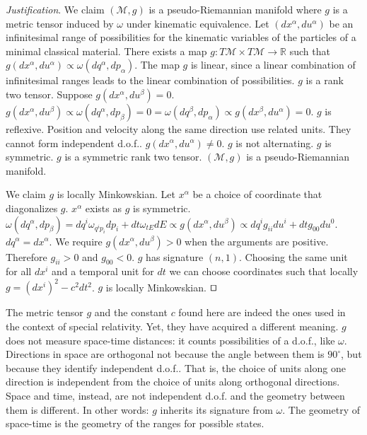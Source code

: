 \documentclass[smallextended]{svjour3}
\numberwithin{equation}{section}
\newenvironment{justification}{\emph{Justification}.}{\hfill\(\qed\)}
\theoremstyle{definition}
\newenvironment{justification}{\emph{Justification}.}{\qed}
\begin{document}
\begin{justification}
	We claim $(\mathcal{M}, g)$ is a pseudo-Riemannian manifold where $g$ is a metric tensor induced by $\omega$ under kinematic equivalence. Let $(dx^\alpha, du^\alpha)$ be an infinitesimal range of possibilities for the kinematic variables of the particles of a minimal classical material. There exists a map $g : T\mathcal{M} \times T\mathcal{M} \rightarrow \mathbb{R}$ such that $g(dx^\alpha, du^\alpha) \propto \omega(dq^\alpha, dp_\alpha)$. The map $g$ is linear, since a linear combination of infinitesimal ranges leads to the linear combination of possibilities. $g$ is a rank two tensor. Suppose $g(dx^\alpha, du^\beta) = 0$. $g(dx^\alpha, du^\beta) \propto \omega(dq^\alpha, dp_\beta) = 0 = \omega(dq^\beta, dp_\alpha) \propto g(dx^\beta, du^\alpha) = 0$. $g$ is reflexive. Position and velocity along the same direction use related units. They cannot form independent d.o.f.. $g(dx^\alpha, du^\alpha) \neq 0$. $g$ is not alternating. $g$ is symmetric. $g$ is a symmetric rank two tensor. $(\mathcal{M}, g)$ is a pseudo-Riemannian manifold.
	
	We claim $g$ is locally Minkowskian. Let $x^\alpha$ be a choice of coordinate that diagonalizes $g$. $x^\alpha$ exists as $g$ is symmetric. $\omega(dq^\alpha, dp_\beta) = dq^i \omega_{q^ip_i} dp_i + dt \omega_{tE} dE \propto g(dx^\alpha, du^\beta) \propto dq^i g_{ii} du^i + dt g_{00} du^0$. $dq^\alpha = dx^\alpha$. We require $g(dx^\alpha, du^\beta)>0$ when the arguments are positive. Therefore $g_{ii} > 0$ and $g_{00} < 0$. $g$ has signature $(n, 1)$. Choosing the same unit for all $dx^i$ and a temporal unit for $dt$ we can choose coordinates such that locally $g = (dx^i)^2 - c^2 dt^2$. $g$ is locally Minkowskian.
\end{justification}

The metric tensor $g$ and the constant $c$ found here are indeed the ones used in the context of special relativity. Yet, they have acquired a different meaning. $g$ does not measure space-time distances: it counts possibilities of a d.o.f., like $\omega$. Directions in space are orthogonal not because the angle between them is $90^\circ$, but because they identify independent d.o.f.. That is, the choice of units along one direction is independent from the choice of units along orthogonal directions. Space and time, instead, are not independent d.o.f. and the geometry between them is different. In other words: $g$ inherits its signature from $\omega$. The geometry of space-time is the geometry of the ranges for possible states.
\end{document}

